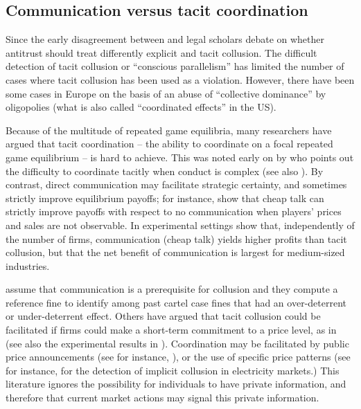 \documentclass[]{article}
\begin{document}
\subsection{Communication versus tacit coordination} \label{lit:tacit}

Since the early disagreement between \citealp{turner1962} and \citealp{posner1968} legal scholars debate on whether antitrust should treat differently explicit and tacit collusion. The difficult detection of tacit collusion or ``conscious parallelism'' has limited the number of cases where tacit collusion has been used as a violation. However, there have been some cases in Europe on the basis of an abuse of ``collective dominance'' by oligopolies (what is also called ``coordinated effects'' in the US). 

Because of the multitude of repeated game equilibria, many researchers have argued that tacit coordination -- the ability to coordinate on a focal repeated game equilibrium -- is hard to achieve. This was noted early on by \cite{green-porter1983} who points out the difficulty to coordinate tacitly when conduct is complex (see also \citealp{Kuhn,Motta2004,chassang2010}). By contrast, direct communication may facilitate strategic certainty, and sometimes strictly improve equilibrium payoffs; for instance, \cite{Awaya2015} show that cheap talk can strictly improve payoffs with respect to no communication when players' prices and sales are not observable. In experimental settings \cite{Fonseca2012} show that, independently of the number of firms, communication (cheap talk) yields higher profits than tacit collusion, but that the net benefit of communication is largest for medium-sized industries.

\cite{allain2011determination} assume that communication is a prerequisite for collusion and they compute a reference fine to identify among past cartel case fines that had an over-deterrent or under-deterrent effect. Others have argued that tacit collusion could be facilitated if firms could make a short-term commitment to a price level, as in \cite{Maskin1988b} (see also the experimental results in \citealt{Leufkens2011}). Coordination may be facilitated by public price announcements (see for instance, \citealt{Marshall2008}), or the use of specific price patterns (see for instance,  \citealp{Macatangay2002,Brown-eckert:2019} for the detection of implicit collusion in electricity markets.) This literature ignores the possibility for individuals to have private information, and therefore that current market actions may signal this private information.
\end{document}
